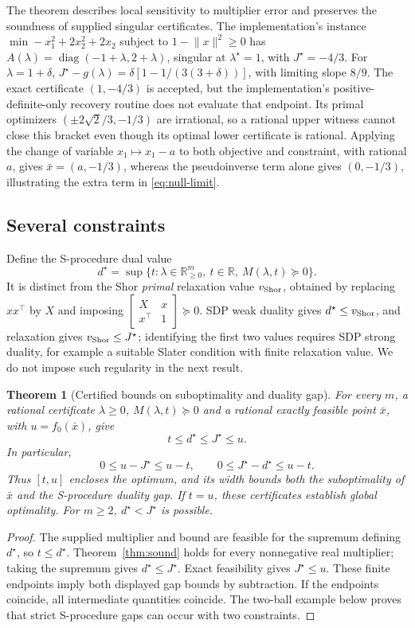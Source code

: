 \documentclass[11pt]{article}
\newcommand{\R}{\mathbb{R}}
\theoremstyle{plain}
\newtheorem{theorem}{Theorem}
\theoremstyle{remark}
\begin{document}
The theorem describes local sensitivity to multiplier error and preserves the
soundness of supplied singular certificates. The implementation's instance
$\min -x_1^2+2x_2^2+2x_2$ subject to $1-\lVert x\rVert^2\ge0$ has
$A(\lambda)=\operatorname{diag}(-1+\lambda,2+\lambda)$, singular at
$\lambda^\star=1$, with $J^\star=-4/3$. For $\lambda=1+\delta$,
$J^\star-g(\lambda)=\delta[1-1/(3(3+\delta))]$, with limiting slope $8/9$.
The exact certificate $(1,-4/3)$ is accepted, but the implementation's
positive-definite-only recovery routine does not evaluate that endpoint.
Its primal optimizers $(\pm2\sqrt2/3,-1/3)$ are irrational, so a rational
upper witness cannot close this bracket even though its optimal lower
certificate is rational. Applying the change of variable $x_1\mapsto x_1-a$
to both objective and constraint, with rational $a$, gives $\bar x=(a,-1/3)$, whereas the pseudoinverse term alone gives
$(0,-1/3)$, illustrating the extra term in \eqref{eq:null-limit}.

\subsection{Several constraints}

Define the S-procedure dual value
\[
d^\star=\sup\{t:\lambda\in\R^m_{\ge0},\ t\in\R,\ M(\lambda,t)\succeq0\}.
\]
It is distinct from the Shor \emph{primal} relaxation value $v_{\rm Shor}$,
obtained by replacing $xx^\top$ by $X$ and imposing
$\left[\begin{smallmatrix}X&x\\x^\top&1\end{smallmatrix}\right]\succeq0$.
SDP weak duality gives $d^\star\le v_{\rm Shor}$, and relaxation gives
$v_{\rm Shor}\le J^\star$; identifying the first
two values requires SDP strong duality, for example a suitable Slater condition
with finite relaxation value. We do not impose such regularity in the next
result.

\begin{theorem}[Certified bounds on suboptimality and duality gap]\label{thm:multi}
For every $m$, a rational certificate $\lambda\ge0$, $M(\lambda,t)\succeq0$
and a rational exactly feasible point $\bar x$, with $u=f_0(\bar x)$, give
\[
t\le d^\star\le J^\star\le u.
\]
In particular,
\[
0\le u-J^\star\le u-t,\qquad 0\le J^\star-d^\star\le u-t.
\]
Thus $[t,u]$ encloses the optimum, and its width bounds both the suboptimality
of $\bar x$ and the S-procedure duality gap. If $t=u$, these certificates
establish global optimality. For $m\ge2$, $d^\star<J^\star$ is possible.
\end{theorem}
\begin{proof}
The supplied multiplier and bound are feasible for the supremum defining
$d^\star$, so $t\le d^\star$. Theorem~\ref{thm:sound} holds for every
nonnegative real multiplier; taking the supremum gives $d^\star\le J^\star$.
Exact feasibility gives $J^\star\le u$. These finite endpoints imply both
displayed gap bounds by subtraction. If the endpoints coincide, all
intermediate quantities coincide. The two-ball example below proves that
strict S-procedure gaps can occur with two constraints.
\end{proof}
\end{document}
